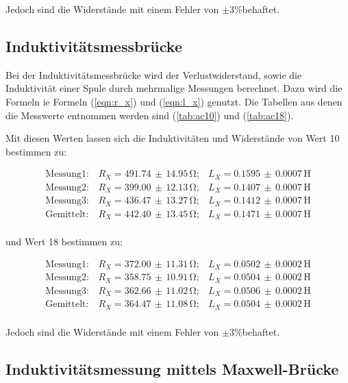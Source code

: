 Jedoch sind die Widerstände mit einem Fehler von $\pm 3\% $behaftet.

\subsection{Induktivitätsmessbrücke}

Bei der Induktivitätsmessbrücke wird der Verlustwiderstand, sowie die Induktivität einer Spule durch mehrmalige Messungen berechnet. Dazu wird die Formeln ie Formeln (\ref{eqn:r_x}) 
und (\ref{eqn:l_x}) genutzt. Die Tabellen aus denen die Messwerte entnommen werden sind (\ref{tab:ac10}) und (\ref{tab:ac18}).

Mit diesen Werten lassen sich die Induktivitäten und Widerstände von Wert 10 bestimmen zu:

\begin{align*}
\text{Messung}1:& R_X = 491.74 \, \pm \, 14.95 \, \si{\ohm};& L_X =  0.1595  \, \pm \, 0.0007 \,  \si{\henry}\\
\text{Messung}2:& R_X = 399.00 \, \pm \, 12.13 \, \si{\ohm};& L_X =  0.1407  \, \pm \, 0.0007 \,   \si{\henry}\\
\text{Messung}3:& R_X = 436.47 \, \pm \, 13.27 \, \si{\ohm};& L_X =  0.1412  \, \pm \, 0.0007 \,    \si{\henry}\\
\text{Gemittelt}:& R_X= 442.40 \, \pm \, 13.45 \, \si{\ohm};& L_X =  0.1471  \, \pm \, 0.0007 \, \si{\henry}\\  %
\end{align*}

und Wert 18 bestimmen zu:

\begin{align*}
\text{Messung}1:& R_X = 372.00 \, \pm \, 11.31 \, \si{\ohm};& L_X =  0.0502 \, \pm \, 0.0002 \, \si{\henry}\\
\text{Messung}2:& R_X = 358.75 \, \pm \, 10.91 \, \si{\ohm};& L_X =  0.0504 \, \pm \, 0.0002 \, \si{\henry}\\
\text{Messung}3:& R_X = 362.66 \, \pm \, 11.02 \, \si{\ohm};& L_X =  0.0506 \, \pm \, 0.0002 \, \si{\henry}\\
\text{Gemittelt}:& R_X= 364.47 \, \pm \, 11.08 \, \si{\ohm};&  L_X = 0.0504 \, \pm \, 0.0002 \, \si{\henry}\\
\end{align*}

Jedoch sind die Widerstände mit einem Fehler von $\pm 3\% $behaftet.


\subsection{Induktivitätsmessung mittels Maxwell-Brücke}

